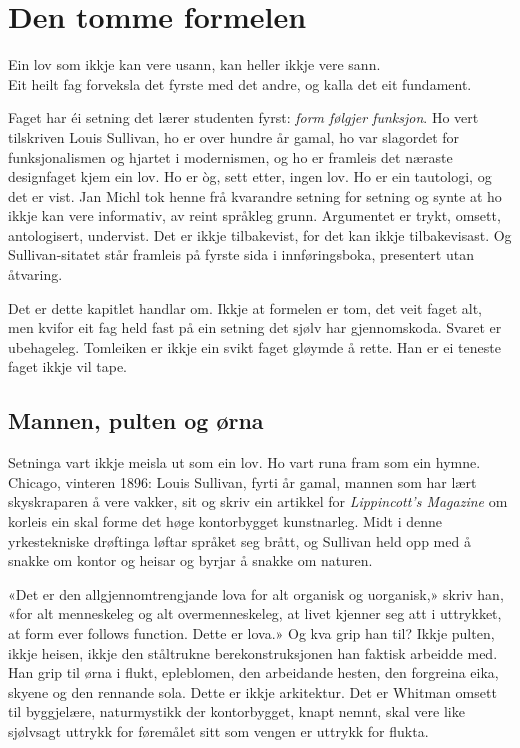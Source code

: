 \chapter{Den tomme formelen}

\begin{motto}
Ein lov som ikkje kan vere usann, kan heller ikkje vere sann.\\ Eit heilt fag forveksla det fyrste med det andre, og kalla det eit fundament.
\end{motto}

Faget har éi setning det lærer studenten fyrst: \emph{form følgjer funksjon}. Ho vert tilskriven Louis Sullivan, ho er over hundre år gamal, ho var slagordet for funksjonalismen og hjartet i modernismen, og ho er framleis det næraste designfaget kjem ein lov. Ho er òg, sett etter, ingen lov. Ho er ein tautologi, og det er vist. Jan Michl tok henne frå kvarandre setning for setning og synte at ho ikkje kan vere informativ, av reint språkleg grunn\autocite{michl1995}. Argumentet er trykt, omsett, antologisert, undervist. Det er ikkje tilbakevist, for det kan ikkje tilbakevisast. Og Sullivan-sitatet står framleis på fyrste sida i innføringsboka, presentert utan åtvaring.

Det er dette kapitlet handlar om. Ikkje at formelen er tom, det veit faget alt, men kvifor eit fag held fast på ein setning det sjølv har gjennomskoda. Svaret er ubehageleg. Tomleiken er ikkje ein svikt faget gløymde å rette. Han er ei teneste faget ikkje vil tape.

\section{Mannen, pulten og ørna}

Setninga vart ikkje meisla ut som ein lov. Ho vart runa fram som ein hymne. Chicago, vinteren 1896: Louis Sullivan, fyrti år gamal, mannen som har lært skyskraparen å vere vakker, sit og skriv ein artikkel for \emph{Lippincott's Magazine} om korleis ein skal forme det høge kontorbygget kunstnarleg\autocite{sullivan1896tall}. Midt i denne yrkestekniske drøftinga løftar språket seg brått, og Sullivan held opp med å snakke om kontor og heisar og byrjar å snakke om naturen.

«Det er den allgjennomtrengjande lova for alt organisk og uorganisk,» skriv han, «for alt menneskeleg og alt overmenneskeleg, at livet kjenner seg att i uttrykket, at form ever follows function. Dette er lova.» Og kva grip han til? Ikkje pulten, ikkje heisen, ikkje den ståltrukne berekonstruksjonen han faktisk arbeidde med. Han grip til ørna i flukt, epleblomen, den arbeidande hesten, den forgreina eika, skyene og den rennande sola. Dette er ikkje arkitektur. Det er Whitman omsett til byggjelære, naturmystikk der kontorbygget, knapt nemnt, skal vere like sjølvsagt uttrykk for føremålet sitt som vengen er uttrykk for flukta.

